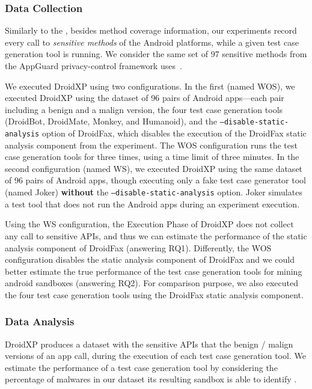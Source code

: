 \subsubsection{Data Collection}

Similarly to the \blls, besides
method coverage information, our experiments record every call
to \emph{sensitive methods} of the Android
platforms, while a given test case generation tool
is running. We consider the
same set of 97 sensitive methods 
from the AppGuard privacy-control framework
uses~\cite{DBLP:conf/esorics/BackesGHMS13}.

We executed DroidXP using two
configurations. In the first (named WOS), we executed DroidXP
using the dataset of 96 pairs of Android apps---each pair
including a benign and a malign version,
the four test case generation tools (DroidBot, DroidMate, Monkey, and Humanoid),
and the \texttt{--disable-static-analysis} option of
DroidFax, which disables the
execution of the DroidFax static analysis
component from the experiment. The WOS configuration
runs the test case generation tools for three times, using
a time limit of three minutes. 
In the second configuration (named WS), we executed DroidXP
using the same dataset of 96 pairs of Android apps, though 
executing only a fake test case generator tool (named Joker)
{\bf without} the \texttt{--disable-static-analysis} option.
Joker simulates a test tool that does not
run the Android apps during an experiment execution.

Using the WS configuration, the Execution Phase of
DroidXP does not collect any call to 
sensitive APIs, and thus we can estimate the performance of the
static analysis component of DroidFax (answering
RQ1).
Differently, the WOS configuration
disables the static analysis component of DroidFax and
we could better estimate the true performance of the test
case generation tools for mining android sandboxes 
(answering RQ2). For comparison purpose, we also
executed the four test case generation tools using the
DroidFax static analysis component. 


\subsubsection{Data Analysis} 

DroidXP produces a
dataset with the sensitive
APIs that the benign / malign
versions of an app call, during
the execution of each test case
generation tool. We estimate the
performance of a test case generation
tool by considering the percentage of
malwares in our dataset
its resulting sandbox is able to identify .

